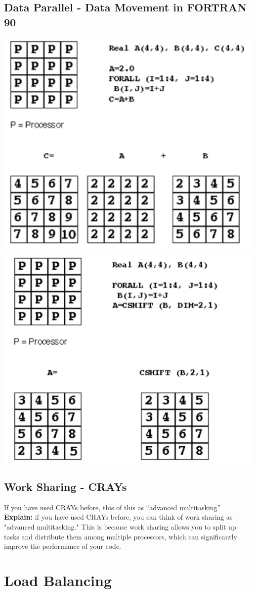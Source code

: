 \documentclass[12pt, a4paper]{book}
\begin{document}
\subsection{Data Parallel - Data Movement in FORTRAN 90}
\includegraphics[width=0.5\linewidth]{figures/Data Movement in FORTRAN 90-01.png}
\includegraphics[width=0.5\linewidth]{figures/Data Movement in FORTRAN 90-02.png}

\subsection{Work Sharing - CRAYs}
If you have used CRAYs before, this of this as “advanced multitasking”\\
\textbf{Explain:} if you have used CRAYs before, you can think of work sharing as "advanced multitasking." This is because work sharing allows you to split up tasks and distribute them among multiple processors, which can significantly improve the performance of your code.
\section{Load Balancing}


\end{document}
